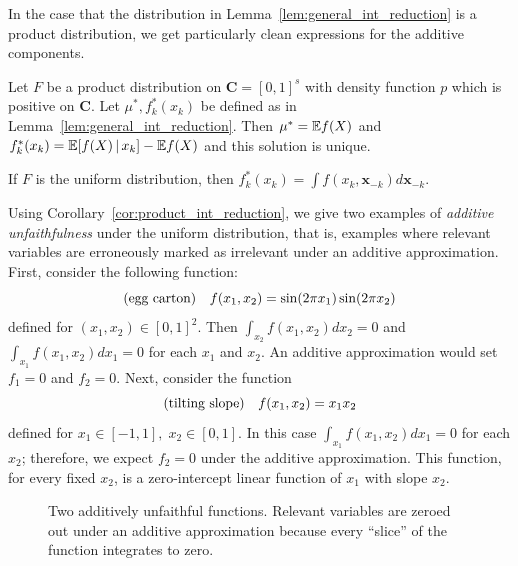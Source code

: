 In the case that the distribution in Lemma~\ref{lem:general_int_reduction} is a product distribution, we get particularly clean expressions for the additive components.

\begin{corollary}
\label{cor:product_int_reduction}
Let $F$ be a product distribution on $\mathbf{C}=[0,1]^s$ with density function $p$ which is positive on $\mathbf{C}$. Let $\mu^*, f^*_k(x_k)$ be defined as in Lemma~\ref{lem:general_int_reduction}.
Then $\mu^* = {\mathbb E} f(X)$ and $f^*_k(x_k) = {\mathbb E}[ f(X) {\,|\,} x_k] - {\mathbb E} f(X)$ and this solution is unique.
\end{corollary}


If $F$ is the uniform distribution,
then $f^*_k(x_k) = \int f(x_k, \mathbf{x}_{-k})
d\mathbf{x}_{-k}$.

\begin{example} Using Corollary~\ref{cor:product_int_reduction}, we give two examples of \emph{additive unfaithfulness} under
  the uniform distribution, that is, examples where relevant variables are erroneously marked as irrelevant under an additive approximation. First, consider the following function:
\[
\textrm{(egg carton)} \quad f(x_1, x_2) = \sin( 2\pi x_1) \sin( 2 \pi x_2)
\]
defined for $(x_1, x_2) \in [0,1]^2$.  Then
$\int_{x_2} f(x_1, x_2) d x_2 = 0$ and
$\int_{x_1} f(x_1, x_2) d x_1 = 0$ for each $x_1$ and $x_2$. An additive approximation
would set $f_1 = 0$ and $f_2 = 0$.  Next, consider the function
\[
\textrm{(tilting slope)} \quad f(x_1, x_2) = x_1 x_2
\]
defined for $x_1 \in [-1,1],\; x_2 \in [0,1]$.  In this case
$\int_{x_1} f(x_1, x_2) d x_1 = 0$ for each $x_2$; therefore, we expect $f_2 = 0$ under the additive approximation. This function, for every fixed $x_2$, is a zero-intercept linear function of $x_1$ with slope $x_2$.
\end{example}

\begin{figure}[htp]
\vskip-10pt
	\centering
\caption{Two additively unfaithful functions. Relevant variables are
  zeroed out under an additive approximation because every ``slice''
  of the function integrates to zero.}
\vskip-10pt
\end{figure}

